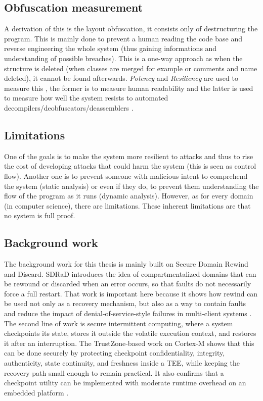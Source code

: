 \documentclass[11pt,a4paper]{report}
\begin{document}
\subsection{Obfuscation measurement}
A derivation of this is the layout obfuscation, it consists only of destructuring the program. 
This is mainly done to prevent a human reading the code base and reverse engineering the whole system (thus gaining informations and understanding of possible breaches). 
This is a one-way approach as when the structure is deleted (when classes are merged for example or comments and name deleted), it cannot be found afterwards. 
\textit{Potency} and \textit{Resiliency} are used to measure this \cite{measure-redundancy}, the former is to measure human readability and the latter is used to measure how well the system resists to automated decompilers/deobfuscators/deassemblers \cite{diversification-obfuscation}. 


\subsection{Limitations}
One of the goals is to make the system more resilient to attacks and thus to rise the cost of developing attacks that could harm the system \cite{diversification-obfuscation} (this is seen as control flow). 
Another one is to prevent someone with malicious intent to comprehend the system (static analysis) or even if they do, to prevent them understanding the flow of the program as it runs (dynamic analysis).
However, as for every domain (in computer science), there are limitations. 
These inherent limitations are that no system is full proof. 


\subsection{Background work}
The background work for this thesis is mainly built on Secure Domain Rewind and Discard.
SDRaD introduces the idea of compartmentalized domains that can be rewound or discarded when an error occurs, so that faults do not necessarily force a full restart.
That work is important here because it shows how rewind can be used not only as a recovery mechanism, but also as a way to contain faults and reduce the impact of denial-of-service-style failures in multi-client systems \cite{sdrad}.
\\

The second line of work is secure intermittent computing, where a system checkpoints its state, stores it outside the volatile execution context, and restores it after an interruption.
The TrustZone-based work on Cortex-M shows that this can be done securely by protecting checkpoint confidentiality, integrity, authenticity, state continuity, and freshness inside a TEE, while keeping the recovery path small enough to remain practical.
It also confirms that a checkpoint utility can be implemented with moderate runtime overhead on an embedded platform \cite{ARM-TrustZone-CortexM}.
\\
\end{document}
